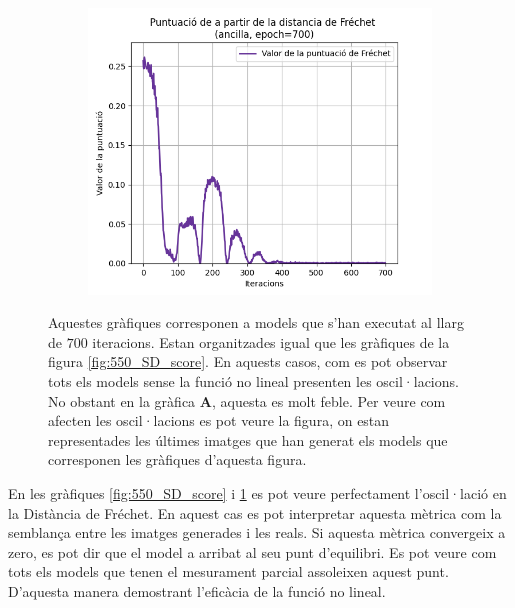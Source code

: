 \begin{figure}[H]
\begin{subfigure}[b]{.32\linewidth}
		\includegraphics[width=\linewidth]{figures/data/FD_score_A6.png}
		\caption{}
	\end{subfigure}
	\caption{Aquestes gràfiques corresponen a models que s'han executat al llarg de $700$ iteracions. Estan organitzades igual que les gràfiques de la figura \ref{fig:550_SD_score}. En aquests casos, com es pot observar tots els models sense la funció no lineal presenten les oscil·lacions. No obstant en la gràfica \textbf{A}, aquesta es molt feble. Per veure com afecten les oscil·lacions es pot veure la figura, on estan representades les últimes imatges que han generat els models que corresponen les gràfiques d'aquesta figura.}
	\label{fig:700_SD_score}
\end{figure}

En les gràfiques \ref{fig:550_SD_score} i \ref{fig:700_SD_score} es pot veure perfectament l'oscil·lació en la Distància de Fréchet. En aquest cas es pot interpretar aquesta mètrica com la semblança entre les imatges generades i les reals. Si aquesta mètrica convergeix a zero, es pot dir que el model a arribat al seu punt d'equilibri. Es pot veure com tots els models que tenen el mesurament parcial assoleixen aquest punt. D'aquesta manera demostrant l'eficàcia de la funció no lineal.

